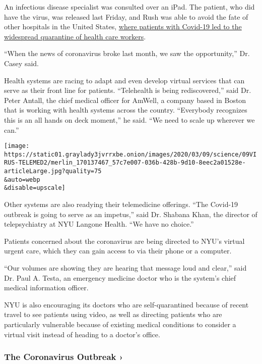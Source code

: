 An infectious disease specialist was consulted over an iPad. The
patient, who did have the virus, was released last Friday, and Rush was
able to avoid the fate of other hospitals in the United States,
\href{https://www.nytimes3xbfgragh.onion/2020/03/05/us/coronavirus-nurses.html}{where
patients with Covid-19 led to the widespread quarantine of health care
workers}.

``When the news of coronavirus broke last month, we saw the
opportunity,'' Dr. Casey said.

Health systems are racing to adapt and even develop virtual services
that can serve as their front line for patients. ``Telehealth is being
rediscovered,'' said Dr. Peter Antall, the chief medical officer for
AmWell, a company based in Boston that is working with health systems
across the country. ``Everybody recognizes this is an all hands on deck
moment,'' he said. ``We need to scale up wherever we can.''

\texttt{[image: https://static01.graylady3jvrrxbe.onion/images/2020/03/09/science/09VIRUS-TELEMED2/merlin\_170137467\_57c7e007-036b-428b-9d10-8eec2a01528e-articleLarge.jpg?quality=75\\\&auto=webp\\\&disable=upscale]}

Other systems are also readying their telemedicine offerings. ``The
Covid-19 outbreak is going to serve as an impetus,'' said Dr. Shabana
Khan, the director of telepsychiatry at NYU Langone Health. ``We have no
choice.''

Patients concerned about the coronavirus are being directed to NYU's
virtual urgent care, which they can gain access to via their phone or a
computer.

``Our volumes are showing they are hearing that message loud and
clear,'' said Dr. Paul A. Testa, an emergency medicine doctor who is the
system's chief medical information officer.

NYU is also encouraging its doctors who are self-quarantined because of
recent travel to see patients using video, as well as directing patients
who are particularly vulnerable because of existing medical conditions
to consider a virtual visit instead of heading to a doctor's office.

\href{https://www.nytimes3xbfgragh.onion/news-event/coronavirus?action=click\&pgtype=Article\&state=default\&region=MAIN_CONTENT_3\&context=storylines_faq}{}

\hypertarget{the-coronavirus-outbreak-}{%
\subsubsection{The Coronavirus Outbreak
›}\label{the-coronavirus-outbreak-}}

